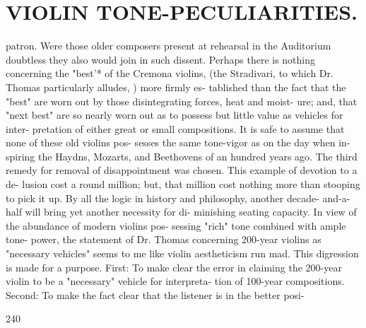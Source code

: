\documentclass{article}
\begin{document}
\section*{VIOLIN TONE-PECULIARITIES.}
patron. Were those older composers present at rehearsal in the Auditorium doubtless they also would join in such dissent. Perhaps there is nothing concerning the "best'* of the Cremona violins, (the Stradivari, to which Dr. Thomas particularly alludes, ) more firmly es- tablished than the fact that the "best" are worn out by those disintegrating forces, heat and moist- ure; and, that "next best" are so nearly worn out as to possess but little value as vehicles for inter- pretation of either great or small compositions. It is safe to assume that none of these old violins pos- sesses the same tone-vigor as on the day when in- spiring the Haydns, Mozarts, and Beethovens of an hundred years ago. The third remedy for removal of disappointment was chosen. This example of devotion to a de- lusion cost a round million; but, that million cost nothing more than stooping to pick it up. By all the logic in history and philosophy, another decade- and-a-half will bring yet another necessity for di- minishing seating capacity. In view of the abundance of modern violins pos- sessing "rich" tone combined with ample tone- power, the statement of Dr. Thomas concerning 200-year violins as "necessary vehicles" seems to me like violin aestheticism run mad. This digression is made for a purpose. First: To make clear the error in claiming the 200-year violin to be a "necessary" vehicle for interpreta- tion of 100-year compositions. Second: To make the fact clear that the listener is in the better posi-

240
\end{document}
